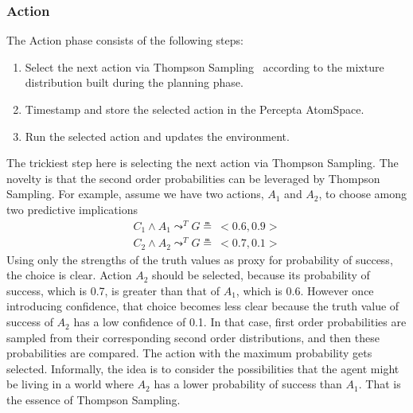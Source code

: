 \documentclass[runningheads]{llncs}
\newcommand{\lpreimp}[1]{\leadsto^{#1}}
\begin{document}
\subsubsection{Action}
The Action phase consists of the following steps:
\begin{enumerate}
\item Select the next action via Thompson Sampling~\cite{Leike2016}
  according to the mixture distribution built during the planning
  phase.
\item Timestamp and store the selected action in the Percepta
  AtomSpace.
\item Run the selected action and updates the environment.
\end{enumerate}
The trickiest step here is selecting the next action via Thompson
Sampling.  The novelty is that the second order probabilities can be
leveraged by Thompson Sampling.  For example, assume we have two
actions, $A_1$ and $A_2$, to choose among two predictive implications
$$
\begin{array}{c}
  C_1 \land A_1 \lpreimp{T} G \measeq\ <\!0.6, 0.9\!> \\
  C_2 \land A_2 \lpreimp{T} G \measeq\ <\!0.7, 0.1\!>
\end{array}
$$
Using only the strengths of the truth values as proxy for probability
of success, the choice is clear.  Action $A_2$ should be selected,
because its probability of success, which is 0.7, is greater than that
of $A_1$, which is 0.6.  However once introducing confidence, that
choice becomes less clear because the truth value of success of $A_2$
has a low confidence of 0.1.  In that case, first order probabilities
are sampled from their corresponding second order distributions,
and then these probabilities are compared.  The action with the
maximum probability gets selected.  Informally, the idea is to
consider the possibilities that the agent might be living in a world
where $A_2$ has a lower probability of success than $A_1$.  That is
the essence of Thompson Sampling.
\end{document}
